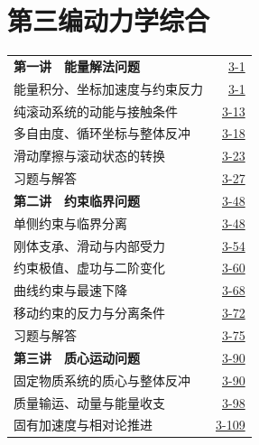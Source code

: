 \section*{第三编\quad 动力学综合}
\begin{longtable}{@{}p{}r@{}}
\textbf{第一讲　能量解法问题}&\href{course-page:3:4}{3-1}\\[2pt]
\hspace{1em}能量积分、坐标加速度与约束反力&\href{course-page:3:4}{3-1}\\[2pt]
\hspace{1em}纯滚动系统的动能与接触条件&\href{course-page:3:16}{3-13}\\[2pt]
\hspace{1em}多自由度、循环坐标与整体反冲&\href{course-page:3:21}{3-18}\\[2pt]
\hspace{1em}滑动摩擦与滚动状态的转换&\href{course-page:3:26}{3-23}\\[2pt]
\hspace{1em}习题与解答&\href{course-page:3:30}{3-27}\\[2pt]
\textbf{第二讲　约束临界问题}&\href{course-page:3:51}{3-48}\\[2pt]
\hspace{1em}单侧约束与临界分离&\href{course-page:3:51}{3-48}\\[2pt]
\hspace{1em}刚体支承、滑动与内部受力&\href{course-page:3:57}{3-54}\\[2pt]
\hspace{1em}约束极值、虚功与二阶变化&\href{course-page:3:63}{3-60}\\[2pt]
\hspace{1em}曲线约束与最速下降&\href{course-page:3:71}{3-68}\\[2pt]
\hspace{1em}移动约束的反力与分离条件&\href{course-page:3:75}{3-72}\\[2pt]
\hspace{1em}习题与解答&\href{course-page:3:78}{3-75}\\[2pt]
\textbf{第三讲　质心运动问题}&\href{course-page:3:93}{3-90}\\[2pt]
\hspace{1em}固定物质系统的质心与整体反冲&\href{course-page:3:93}{3-90}\\[2pt]
\hspace{1em}质量输运、动量与能量收支&\href{course-page:3:101}{3-98}\\[2pt]
\hspace{1em}固有加速度与相对论推进&\href{course-page:3:112}{3-109}\\[2pt]

\end{longtable}
